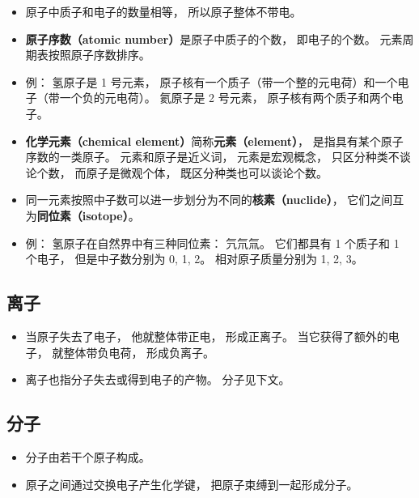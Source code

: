 \begin{itemize}
\item 原子中质子和电子的数量相等， 所以原子整体不带电。
\item \textbf{原子序数（atomic number）}是原子中质子的个数， 即电子的个数。 元素周期表按照原子序数排序。
\item 例： 氢原子是 1 号元素， 原子核有一个质子（带一个整的元电荷）和一个电子（带一个负的元电荷）。 氦原子是 2 号元素， 原子核有两个质子和两个电子。
\item \textbf{化学元素（chemical element）}简称\textbf{元素（element）}， 是指具有某个原子序数的一类原子。 元素和原子是近义词， 元素是宏观概念， 只区分种类不谈论个数， 而原子是微观个体， 既区分种类也可以谈论个数。
\item 同一元素按照中子数可以进一步划分为不同的\textbf{核素（nuclide）}， 它们之间互为\textbf{同位素（isotope）}。
\item 例： 氢原子在自然界中有三种同位素： 氕氘氚。 它们都具有 1 个质子和 1 个电子， 但是中子数分别为 0, 1, 2。 相对原子质量分别为 1, 2, 3。
\end{itemize}

\subsection{离子}
\begin{itemize}
\item 当原子失去了电子， 他就整体带正电， 形成正离子。 当它获得了额外的电子， 就整体带负电荷， 形成负离子。
\item 离子也指分子失去或得到电子的产物。 分子见下文。
\end{itemize}

\subsection{分子}
\begin{itemize}
\item 分子由若干个原子构成。
\item 原子之间通过交换电子产生化学键， 把原子束缚到一起形成分子。
\end{itemize}
